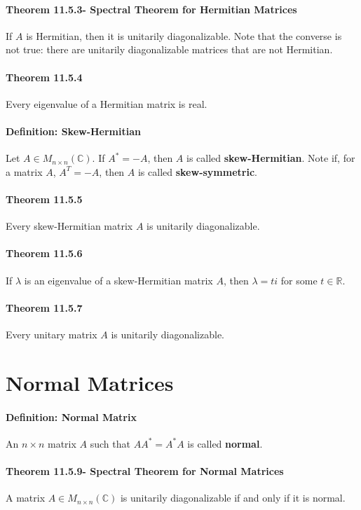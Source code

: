 \documentclass[10pt,letter]{article}
\begin{document}
\paragraph{Theorem 11.5.3- Spectral Theorem for Hermitian Matrices}
If $A$ is Hermitian, then it is unitarily diagonalizable. Note that the converse is not true: there are unitarily diagonalizable matrices that are not Hermitian. 
\paragraph{Theorem 11.5.4}
Every eigenvalue of a Hermitian matrix is real.
\paragraph{Definition: Skew-Hermitian}
Let $A\in M_{n\times n}(\mathbb{C})$. If $A^*=-A$, then $A$ is called \textbf{skew-Hermitian}. Note if, for a matrix $A$, $A^T=-A$, then $A$ is called \textbf{skew-symmetric}.
\paragraph{Theorem 11.5.5}
Every skew-Hermitian matrix $A$ is unitarily diagonalizable. 
\paragraph{Theorem 11.5.6}
If $\lambda$ is an eigenvalue of a skew-Hermitian matrix $A$, then $\lambda=ti$ for some $t\in\mathbb{R}$. 
\paragraph{Theorem 11.5.7}
Every unitary matrix $A$ is unitarily diagonalizable. 

\section*{Normal Matrices}
\paragraph{Definition: Normal Matrix}
An $n\times n$ matrix $A$ such that $AA^*=A^*A$ is called \textbf{normal}. 
\paragraph{Theorem 11.5.9- Spectral Theorem for Normal Matrices}
A matrix $A\in M_{n\times n}(\mathbb{C})$ is unitarily diagonalizable if and only if it is normal. 
\end{document}
